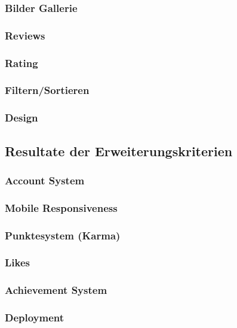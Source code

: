 \subsubsection*{Bilder Gallerie}
\subsubsection*{Reviews}
\subsubsection*{Rating}
\subsubsection*{Filtern/Sortieren}
\subsubsection*{Design}

\subsection{Resultate der Erweiterungskriterien}

\subsubsection*{Account System}
\subsubsection*{Mobile Responsiveness}
\subsubsection*{Punktesystem (Karma)}
\subsubsection*{Likes}
\subsubsection*{Achievement System}
\subsubsection*{Deployment}







